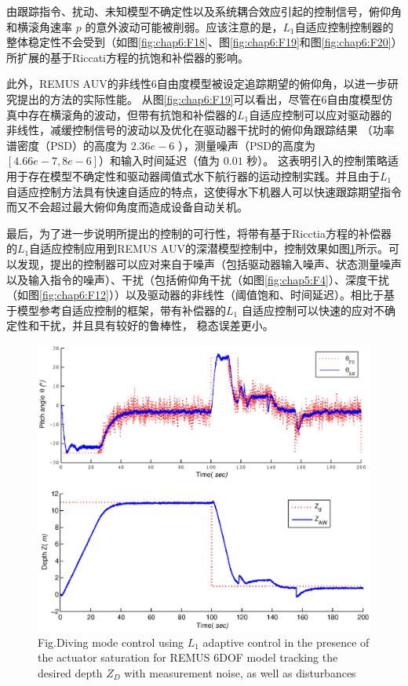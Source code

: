 由跟踪指令、扰动、未知模型不确定性以及系统耦合效应引起的控制信号，俯仰角和横滚角速率 $p$ 的意外波动可能被削弱。应该注意的是，$L_{1}$自适应控制控制器的整体稳定性不会受到（如图\ref{fig:chap6:F18}、图\ref{fig:chap6:F19}和图\ref{fig:chap6:F20}）所扩展的基于Riccati方程的抗饱和补偿器的影响。

此外，REMUS AUV的非线性6自由度模型被设定追踪期望的俯仰角，以进一步研究提出的方法的实际性能。 从图\ref{fig:chap6:F19}可以看出，尽管在6自由度模型仿真中存在横滚角的波动，但带有抗饱和补偿器的$L_{1}$自适应控制可以应对驱动器的非线性，减缓控制信号的波动以及优化在驱动器干扰时的俯仰角跟踪结果 （功率谱密度（PSD）的高度为 $ 2.36e-6$ ），测量噪声（PSD的高度为 $[4.66e-7,8e-6]$）和输入时间延迟（值为 $0.01$ 秒）。 这表明引入的控制策略适用于存在模型不确定性和驱动器阈值式水下航行器的运动控制实践。并且由于$L_{1}$自适应控制方法具有快速自适应的特点，这使得水下机器人可以快速跟踪期望指令而又不会超过最大俯仰角度而造成设备自动关机。

最后，为了进一步说明所提出的控制的可行性，将带有基于Ricctia方程的补偿器的$L_1$自适应控制应用到REMUS AUV的深潜模型控制中，控制效果如图\ref{fig:chap6:F21}所示。可以发现，提出的控制器可以应对来自于噪声（包括驱动器输入噪声、状态测量噪声以及输入指令的噪声）、干扰（包括俯仰角干扰（如图\ref{fig:chap5:F4}）、深度干扰（如图\ref{fig:chap6:F12}））以及驱动器的非线性（阈值饱和、时间延迟）。相比于基于模型参考自适应控制的框架，带有补偿器的$L_1$ 自适应控制可以快速的应对不确定性和干扰，并且具有较好的鲁棒性， 稳态误差更小。

 \begin{figure}[htp]
 \centering
 \includegraphics[width=15cm]{figure/chap6/F9_l1aw_withnoise_depth.eps}
 \label{fig:chap6:F21}
  {Fig.}{Diving mode control using \texorpdfstring{$L_1$}{} adaptive control in the presence of the actuator saturation for REMUS 6DOF model tracking the desired depth $Z_{D}$ with measurement noise, as well as disturbances }
 \end{figure}


